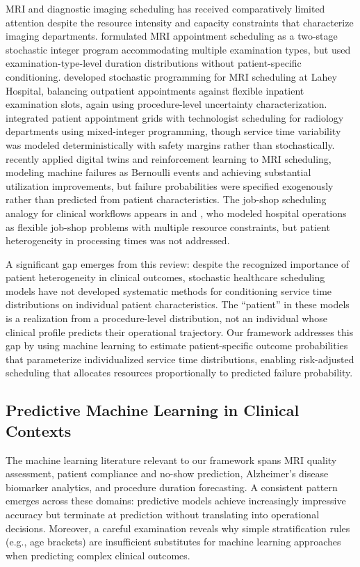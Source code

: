 \documentclass[11pt,a4paper]{article}
\begin{document}
MRI and diagnostic imaging scheduling has received comparatively limited attention despite the resource intensity and capacity constraints that characterize imaging departments. \citet{qiu2019mri} formulated MRI appointment scheduling as a two-stage stochastic integer program accommodating multiple examination types, but used examination-type-level duration distributions without patient-specific conditioning. \citet{li2021stochastic} developed stochastic programming for MRI scheduling at Lahey Hospital, balancing outpatient appointments against flexible inpatient examination slots, again using procedure-level uncertainty characterization. \citet{bouguerra2023integrating} integrated patient appointment grids with technologist scheduling for radiology departments using mixed-integer programming, though service time variability was modeled deterministically with safety margins rather than stochastically. \citet{lopez2025mri} recently applied digital twins and reinforcement learning to MRI scheduling, modeling machine failures as Bernoulli events and achieving substantial utilization improvements, but failure probabilities were specified exogenously rather than predicted from patient characteristics. The job-shop scheduling analogy for clinical workflows appears in \citet{burdett2018flexible} and \citet{pham2008surgical}, who modeled hospital operations as flexible job-shop problems with multiple resource constraints, but patient heterogeneity in processing times was not addressed.

A significant gap emerges from this review: despite the recognized importance of patient heterogeneity in clinical outcomes, stochastic healthcare scheduling models have not developed systematic methods for conditioning service time distributions on individual patient characteristics. The ``patient'' in these models is a realization from a procedure-level distribution, not an individual whose clinical profile predicts their operational trajectory. Our framework addresses this gap by using machine learning to estimate patient-specific outcome probabilities that parameterize individualized service time distributions, enabling risk-adjusted scheduling that allocates resources proportionally to predicted failure probability.

\subsection{Predictive Machine Learning in Clinical Contexts}

The machine learning literature relevant to our framework spans MRI quality assessment, patient compliance and no-show prediction, Alzheimer's disease biomarker analytics, and procedure duration forecasting. A consistent pattern emerges across these domains: predictive models achieve increasingly impressive accuracy but terminate at prediction without translating into operational decisions. Moreover, a careful examination reveals why simple stratification rules (e.g., age brackets) are insufficient substitutes for machine learning approaches when predicting complex clinical outcomes.
\end{document}
